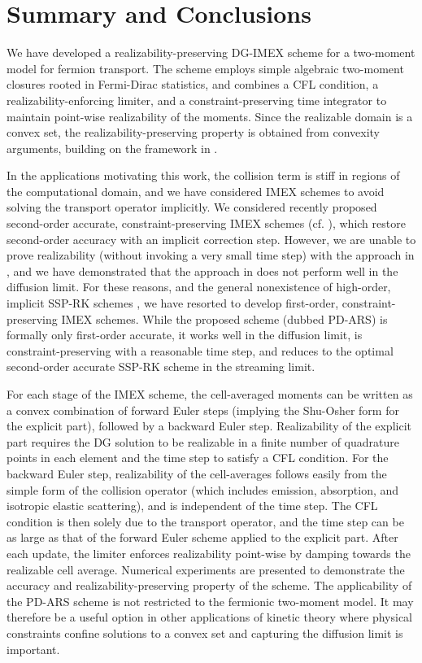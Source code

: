 \section{Summary and Conclusions}
\label{sec:conclusions}

We have developed a realizability-preserving DG-IMEX scheme for a two-moment model for fermion transport.  
The scheme employs simple algebraic two-moment closures rooted in Fermi-Dirac statistics, and combines a CFL condition, a realizability-enforcing limiter, and a constraint-preserving time integrator to maintain point-wise realizability of the moments.  
Since the realizable domain is a convex set, the realizability-preserving property is obtained from convexity arguments, building on the framework in \cite{zhangShu_2010a}.  

In the applications motivating this work, the collision term is stiff in regions of the computational domain, and we have considered IMEX schemes to avoid solving the transport operator implicitly.  
We considered recently proposed second-order accurate, constraint-preserving IMEX schemes (cf. \cite{chertock_etal_2015,hu_etal_2018}), which restore second-order accuracy with an implicit correction step.  
However, we are unable to prove realizability (without invoking a very small time step) with the approach in \cite{chertock_etal_2015}, and we have demonstrated that the approach in \cite{hu_etal_2018} does not perform well in the diffusion limit.  
For these reasons, and the general nonexistence of high-order, implicit SSP-RK schemes \cite{gottlieb_etal_2001}, we have resorted to develop first-order, constraint-preserving IMEX schemes.  
While the proposed scheme (dubbed PD-ARS) is formally only first-order accurate, it works well in the diffusion limit, is constraint-preserving with a reasonable time step, and reduces to the optimal second-order accurate SSP-RK scheme in the streaming limit.  

For each stage of the IMEX scheme, the cell-averaged moments can be written as a convex combination of forward Euler steps (implying the Shu-Osher form for the explicit part), followed by a backward Euler step.  
Realizability of the explicit part requires the DG solution to be realizable in a finite number of quadrature points in each element and the time step to satisfy a CFL condition.  
For the backward Euler step, realizability of the cell-averages follows easily from the simple form of the collision operator (which includes emission, absorption, and isotropic elastic scattering), and is independent of the time step.  
The CFL condition is then solely due to the transport operator, and the time step can be as large as that of the forward Euler scheme applied to the explicit part.  
After each update, the limiter enforces realizability point-wise by damping towards the realizable cell average.  
Numerical experiments are presented to demonstrate the accuracy and realizability-preserving property of the scheme.  
The applicability of the PD-ARS scheme is not restricted to the fermionic two-moment model.  
It may therefore be a useful option in other applications of kinetic theory where physical constraints confine solutions to a convex set and capturing the diffusion limit is important.  

